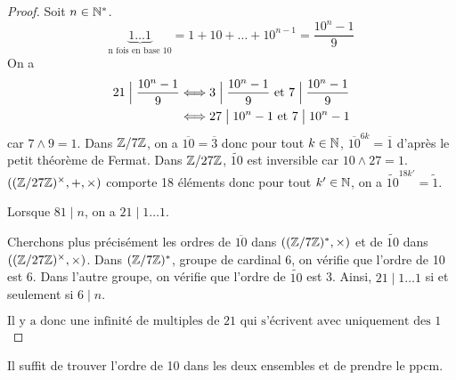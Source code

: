 \documentclass[12pt]{article}
\begin{document}
\begin{proof}
	Soit $n\in\mathbb{N}^{*}$.
	\begin{equation}
		\underbrace{1\dots 1}_{\text{n fois en base 10}}=1+10+\dots+10^{n-1}=\frac{10^{n}-1}{9}
	\end{equation}
	On a 
	\begin{align}
		21\Bigm|\frac{10^{n}-1}{9}
		&\Longleftrightarrow 3\Bigm|\frac{10^{n}-1}{9}\text{ et }7\Bigm|\frac{10^{n}-1}{9}\\
		&\Longleftrightarrow 27\bigm|10^{n}-1\text{ et }7\bigm| 10^{n}-1
	\end{align}
	car $7\wedge 9=1$.
	Dans $\mathbb{Z}/7\mathbb{Z}$, on a $\overline{10}=\overline{3}$ donc pour tout $k\in\mathbb{N}$, $\overline{10}^{6k}=\overline{1}$ d'après le petit théorème de Fermat. Dans $\mathbb{Z}/27\mathbb{Z}$, $\widetilde{10}$ est inversible car $10\wedge 27=1$. $\left((\mathbb{Z}/27\mathbb{Z})^{\times},+,\times\right)$ comporte 18 éléments donc pour tout $k'\in\mathbb{N}$, on a $\widetilde{10}^{18k'}=\widetilde{1}$.

	Lorsque $81\mid n$, on a $21\mid 1\dots 1$. 
	
	Cherchons plus précisément les ordres de $\overline{10}$ dans $((\mathbb{Z}/7\mathbb{Z})^{*},\times)$ et de $\widetilde{10}$ dans $((\mathbb{Z}/27\mathbb{Z})^{\times},\times)$.
	Dans $(\mathbb{Z}/7\mathbb{Z})^{*}$, groupe de cardinal 6, on vérifie que l'ordre de 10 est 6. Dans l'autre groupe, on vérifie que l'ordre de $\widetilde{10}$ est 3. Ainsi, $21\mid 1\dots 1$ si et seulement si $6\mid n$.

	\begin{equation}
		\boxed{\text{Il y a donc une infinité de multiples de 21 qui s'écrivent avec uniquement des 1 en base 10.}}
	\end{equation}
\end{proof}

\begin{remark}
	Il suffit de trouver l'ordre de 10 dans les deux ensembles et de prendre le ppcm.
\end{remark}
\end{document}
